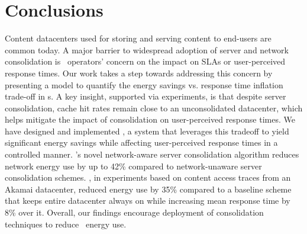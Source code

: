 \section{Conclusions}
Content datacenters used for storing and serving content to end-users are common today. A major barrier to  widespread adoption of server and network consolidation is \cdc\ operators' concern on the impact on SLAs or user-perceived response times. Our work takes a step towards addressing this concern by presenting a model to quantify the energy savings vs. response time inflation trade-off in \cdc s.  A key insight, supported via experiments, is that despite server consolidation, cache hit rates remain close to an unconsolidated datacenter,  which helps mitigate the impact of consolidation on user-perceived response times. We have designed and implemented \shrink, a system that leverages this tradeoff to yield significant energy savings while affecting user-perceived response times in a controlled manner. \shrink's novel network-aware server consolidation algorithm reduces network energy use by up to 42\% compared to network-unaware server consolidation schemes. \shrink, in experiments based on content access traces from an Akamai datacenter, reduced energy use by 35\% compared to a baseline scheme that keeps entire datacenter always on while increasing mean response time by 8\% over it. Overall, our findings encourage deployment of consolidation techniques to reduce \cdc\ energy use.

